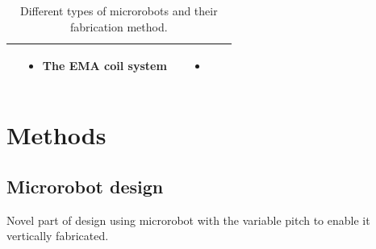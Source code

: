 \documentclass[12pt,a4paper,titlepage]{report}
\newcommand{\hilight}[1]{\colorbox{yellow}{#1}}
\begin{document}
\begin{table}[h!]
\begin{tabular}{ c m{2.5cm}  m{4.3cm} m{3cm} m{2cm}}
\begin{minipage}[t]{3cm}
\begin{itemize}
      \end{itemize}
    \end{minipage}
    & 
    \begin{minipage}[t]{4cm}
      \begin{itemize}
        \item The EMA coil system
     
      \end{itemize}
    \end{minipage}
&



	&
	   \begin{itemize}
        \item \citep{ko2012jellyfish}
   
      \end{itemize}
    \\ \hline








  \end{tabular}
  
  \caption{Different types of microrobots and their fabrication method.}\label{Micro}
\end{table}



\chapter{Methods}









\section{Microrobot design} \label{microDesign}

Novel part of design using microrobot with the variable pitch to enable it vertically fabricated.
\end{document}
